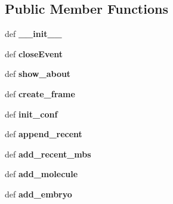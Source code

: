 \subsection*{Public Member Functions}
\begin{DoxyCompactItemize}
\item 
\hypertarget{classpyfrp__app_1_1pyfrp_a45c2b5c7d4f88bb20a4ceabe900d9a86}{def {\bfseries \+\_\+\+\_\+init\+\_\+\+\_\+}}\label{classpyfrp__app_1_1pyfrp_a45c2b5c7d4f88bb20a4ceabe900d9a86}

\item 
\hypertarget{classpyfrp__app_1_1pyfrp_a3f937942f2e64f0676f3a86da48f19ea}{def {\bfseries close\+Event}}\label{classpyfrp__app_1_1pyfrp_a3f937942f2e64f0676f3a86da48f19ea}

\item 
\hypertarget{classpyfrp__app_1_1pyfrp_a2399d8c9e71409db81443b3f38172443}{def {\bfseries show\+\_\+about}}\label{classpyfrp__app_1_1pyfrp_a2399d8c9e71409db81443b3f38172443}

\item 
\hypertarget{classpyfrp__app_1_1pyfrp_a3f8f06392e2b13b1c7ce11d4e36dccac}{def {\bfseries create\+\_\+frame}}\label{classpyfrp__app_1_1pyfrp_a3f8f06392e2b13b1c7ce11d4e36dccac}

\item 
\hypertarget{classpyfrp__app_1_1pyfrp_ab073245b66a0f4e5a1f64d6fb302a4a3}{def {\bfseries init\+\_\+conf}}\label{classpyfrp__app_1_1pyfrp_ab073245b66a0f4e5a1f64d6fb302a4a3}

\item 
\hypertarget{classpyfrp__app_1_1pyfrp_a82d010d3eb0ec3efc397f5b8e8cc620a}{def {\bfseries append\+\_\+recent}}\label{classpyfrp__app_1_1pyfrp_a82d010d3eb0ec3efc397f5b8e8cc620a}

\item 
\hypertarget{classpyfrp__app_1_1pyfrp_ac658e2ddb4241674112e99356da2f04c}{def {\bfseries add\+\_\+recent\+\_\+mbs}}\label{classpyfrp__app_1_1pyfrp_ac658e2ddb4241674112e99356da2f04c}

\item 
\hypertarget{classpyfrp__app_1_1pyfrp_a5d34580abe8086a99c4580821610f7d8}{def {\bfseries add\+\_\+molecule}}\label{classpyfrp__app_1_1pyfrp_a5d34580abe8086a99c4580821610f7d8}

\item 
\hypertarget{classpyfrp__app_1_1pyfrp_a76e1016a9cbde9f1cd49c98ffee6ae62}{def {\bfseries add\+\_\+embryo}}\label{classpyfrp__app_1_1pyfrp_a76e1016a9cbde9f1cd49c98ffee6ae62}


\end{DoxyCompactItemize}
